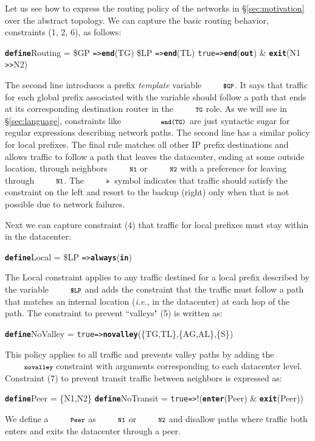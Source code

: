 \documentclass[numbers, 10pt, preprint]{sigplanconf}
\newcommand{\IE}{\emph{i.e.}}
\newcommand{\CD}[1]{\texttt{\small #1}}  %
\newcommand{\KW}[1]{\texttt{\small\bfseries{#1}}}
\newcommand{\True}{\CD{true}}
\newcommand{\Define}{\KW{define}}
\newcommand{\Prefer}{\texttt{>>}}
\newcommand{\Path}{\texttt{=>}}
\newcommand{\In}{\KW{in}}
\newcommand{\Out}{\KW{out}}
\newcommand{\Exit}{\KW{exit}}
\newcommand{\End}{\KW{end}}
\newcommand{\Enter}{\KW{enter}}
\newcommand{\Always}{\KW{always}}
\newcommand{\Novalley}{\KW{novalley}}
\begin{document}
Let us see how to express the routing policy of the networks in \S\ref{sec:motivation} over the abstract topology. We can capture the basic routing behavior, constraints (1, 2, 6),  as follows:
%
\begin{code}
\Define Routing =
    \$GP  \Path \End(TG)
    \$LP  \Path \End(TL)
    \True \Path \End(\Out) & \Exit(N1 \Prefer N2)
\end{code}
\noindent%

The second line introduces a prefix \emph{template} variable $\CD{\$GP}$. It says that traffic for each global prefix associated with the variable should follow a path that ends at its corresponding destination router in the $\CD{TG}$ role. As we will see in \S\ref{sec:language}, constraints like $\CD{\End(TG)}$ are just syntactic sugar for regular expressions describing network paths. The second line has a similar policy for local prefixes.
%
The final rule matches all other IP prefix destinations and allows traffic to follow a path that leaves the datacenter, ending at some outside location, through neighbors $\CD{N1}$ or $\CD{N2}$ with a preference for leaving through $\CD{N1}$. The $\CD{\Prefer}$~symbol indicates that traffic should satisfy the constraint on the left and resort to the backup (right) only when that is not possible due to network failures.%

Next we can capture constraint (4) that traffic for local prefixes must stay within in the datacenter:
%
\begin{code}
\Define Local =
    \$LP \Path \Always(\In)
\end{code}
\noindent%
%
The Local constraint applies to any traffic destined for a local prefix described by the variable $\CD{\$LP}$ and adds the constraint that the traffic must follow a path that matches an internal location (\IE, in the datacenter) at each hop of the path.
%
The constraint to prevent ``valleys" (5) is written as:
%
\begin{code}
\Define NoValley =
    \True \Path \Novalley(\{TG,TL\},\{AG,AL\},\{S\})
\end{code}
\noindent%
%
This policy applies to all traffic and prevents valley paths by adding the $\Novalley$ constraint with arguments corresponding to each datacenter level.
%
Constraint (7) to prevent transit traffic between neighbors is expressed as:
%
\begin{code}
\Define Peer = \{N1,N2\}
\Define NoTransit =
    \True \Path !(\Enter(Peer) & \Exit(Peer))
\end{code}
\noindent%
%
We define a $\CD{Peer}$ as $\CD{N1}$ or $\CD{N2}$ and disallow paths where traffic both enters and exits the datacenter through a peer.
\end{document}
